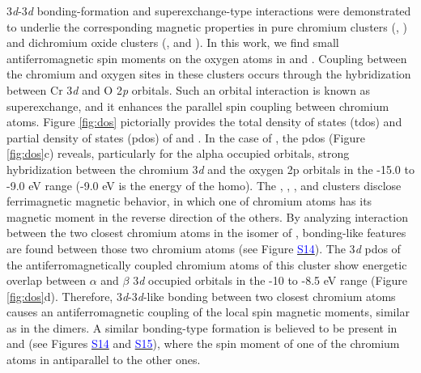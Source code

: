 \begin{refsection}

3\textit{d}-3\textit{d} bonding-formation and superexchange-type interactions were demonstrated to underlie the corresponding magnetic properties in pure chromium clusters (, ) \cite{bondybey1983, Cr2t, Cr2x} and dichromium oxide clusters (, and ).\cite{Tono2003, Tono2003B, paul2009Cr2On} In this work, we find small antiferromagnetic spin moments on the oxygen atoms in  and . Coupling between the chromium and oxygen sites in these clusters occurs through the hybridization between Cr 3\textit{d} and O 2\textit{p} orbitals. Such an orbital interaction is known as superexchange, and it enhances the parallel spin coupling between chromium atoms. \cite{Tono2003,Tono2003B,paul2009Cr2On} Figure \ref{fig:dos} pictorially provides the total density of states (\acrshort{tdos}) and partial density of states (\acrshort{pdos}) of  and . In the case of , the \acrshort{pdos} (Figure \ref{fig:dos}c) reveals, particularly for the alpha occupied orbitals, strong hybridization between the chromium 3\textit{d} and the oxygen 2p orbitals in the -15.0 to -9.0 eV range (-9.0 eV is the energy of the \acrshort{homo}). The , , , and  clusters disclose ferrimagnetic magnetic behavior, in which one of chromium atoms has its magnetic moment in the reverse direction of the others. By analyzing interaction between the two closest chromium atoms in the  isomer of , bonding-like features are found between those two chromium atoms (see Figure \href{https://pubs.acs.org/doi/suppl/10.1021/acs.jpcc.8b10035/suppl_file/jp8b10035_si_002.pdf}{\textcolor{blue}{S14}}). The 3\textit{d} \acrshort{pdos} of the antiferromagnetically coupled chromium atoms of this cluster show energetic overlap between $\alpha$ and $\beta$ 3\textit{d} occupied orbitals in the -10 to -8.5 eV range (Figure \ref{fig:dos}d). Therefore, 3\textit{d}-3\textit{d}-like bonding between two closest chromium atoms causes an antiferromagnetic coupling of the local spin magnetic moments, similar as in the  dimers. \cite{Cr2t,Cr2x} A similar bonding-type formation is believed to be present in  and  (see Figures \href{https://pubs.acs.org/doi/suppl/10.1021/acs.jpcc.8b10035/suppl_file/jp8b10035_si_002.pdf}{\textcolor{blue}{S14}} and \href{https://pubs.acs.org/doi/suppl/10.1021/acs.jpcc.8b10035/suppl_file/jp8b10035_si_002.pdf}{\textcolor{blue}{S15}}), where the spin moment of one of the chromium atoms in antiparallel to the other ones. 



\end{refsection}
